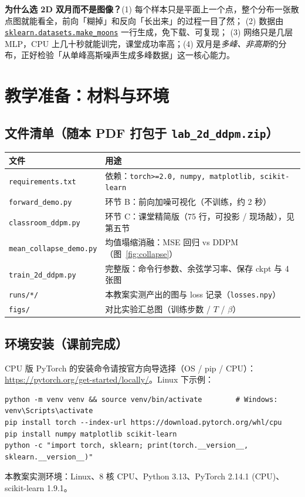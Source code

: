 \documentclass[a4paper,fontset=none,zihao=5]{ctexart}
\newcommand{\code}[1]{\texttt{#1}}
\begin{document}
\begin{whybox}
\textbf{为什么选 2D 双月而不是图像？}(1) 每个样本只是平面上一个点，整个分布一张散点图就能看全，前向「糊掉」和反向「长出来」的过程一目了然；
(2) 数据由 \href{https://scikit-learn.org/stable/modules/generated/sklearn.datasets.make_moons.html}{\code{sklearn.datasets.make\_moons}} 一行生成，免下载、可复现；
(3) 网络只是几层 MLP，CPU 上几十秒就能训完，课堂成功率高；(4) 双月是\emph{多峰、非高斯}的分布，正好检验「从单峰高斯噪声生成多峰数据」这一核心能力。
\end{whybox}

\section{教学准备：材料与环境}
\subsection{文件清单（随本 PDF 打包于 \code{lab\_2d\_ddpm.zip}）}
\begin{center}\small
\begin{tabular}{@{}ll@{}}
\toprule
文件 & 用途 \\
\midrule
\code{requirements.txt} & 依赖：\code{torch>=2.0, numpy, matplotlib, scikit-learn} \\
\code{forward\_demo.py} & 环节 B：前向加噪可视化（不训练，约 2 秒） \\
\code{classroom\_ddpm.py} & 环节 C：课堂精简版（75 行，可投影 / 现场敲），见第五节 \\
\code{mean\_collapse\_demo.py} & 均值塌缩消融：MSE 回归 vs DDPM（图~\ref{fig:collapse}） \\
\code{train\_2d\_ddpm.py} & 完整版：命令行参数、余弦学习率、保存 ckpt 与 4 张图 \\
\code{runs/*/} & 本教案实测产出的图与 loss 记录（\code{losses.npy}） \\
\code{figs/} & 对比实验汇总图（训练步数 / $T$ / $\beta$） \\
\bottomrule
\end{tabular}
\end{center}

\subsection{环境安装（课前完成）}
CPU 版 PyTorch 的安装命令请按官方向导选择（OS / pip / CPU）：\url{https://pytorch.org/get-started/locally/}。Linux 下示例：
\begin{lstlisting}[style=sh]
python -m venv venv && source venv/bin/activate        # Windows: venv\Scripts\activate
pip install torch --index-url https://download.pytorch.org/whl/cpu
pip install numpy matplotlib scikit-learn
python -c "import torch, sklearn; print(torch.__version__, sklearn.__version__)"
\end{lstlisting}
本教案实测环境：Linux、8 核 CPU、Python 3.13、PyTorch 2.14.1 (CPU)、scikit-learn 1.9.1。
\end{document}
